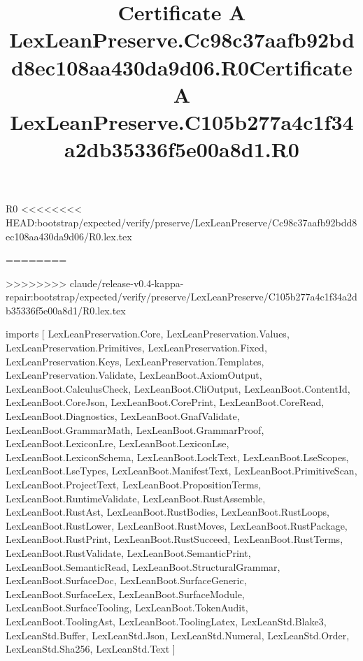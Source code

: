 \begin{lexlean}{R0}
<<<<<<<< HEAD:bootstrap/expected/verify/preserve/LexLeanPreserve/Cc98c37aafb92bdd8ec108aa430da9d06/R0.lex.tex
\title{Certificate A LexLeanPreserve.Cc98c37aafb92bdd8ec108aa430da9d06.R0}
========
\title{Certificate A LexLeanPreserve.C105b277a4c1f34a2db35336f5e00a8d1.R0}
>>>>>>>> claude/release-v0.4-kappa-repair:bootstrap/expected/verify/preserve/LexLeanPreserve/C105b277a4c1f34a2db35336f5e00a8d1/R0.lex.tex
\begin{coremodule}
imports [
  LexLeanPreservation.Core,
  LexLeanPreservation.Values,
  LexLeanPreservation.Primitives,
  LexLeanPreservation.Fixed,
  LexLeanPreservation.Keys,
  LexLeanPreservation.Templates,
  LexLeanPreservation.Validate,
  LexLeanBoot.AxiomOutput,
  LexLeanBoot.CalculusCheck,
  LexLeanBoot.CliOutput,
  LexLeanBoot.ContentId,
  LexLeanBoot.CoreJson,
  LexLeanBoot.CorePrint,
  LexLeanBoot.CoreRead,
  LexLeanBoot.Diagnostics,
  LexLeanBoot.GnafValidate,
  LexLeanBoot.GrammarMath,
  LexLeanBoot.GrammarProof,
  LexLeanBoot.LexiconLre,
  LexLeanBoot.LexiconLse,
  LexLeanBoot.LexiconSchema,
  LexLeanBoot.LockText,
  LexLeanBoot.LseScopes,
  LexLeanBoot.LseTypes,
  LexLeanBoot.ManifestText,
  LexLeanBoot.PrimitiveScan,
  LexLeanBoot.ProjectText,
  LexLeanBoot.PropositionTerms,
  LexLeanBoot.RuntimeValidate,
  LexLeanBoot.RustAssemble,
  LexLeanBoot.RustAst,
  LexLeanBoot.RustBodies,
  LexLeanBoot.RustLoops,
  LexLeanBoot.RustLower,
  LexLeanBoot.RustMoves,
  LexLeanBoot.RustPackage,
  LexLeanBoot.RustPrint,
  LexLeanBoot.RustSucceed,
  LexLeanBoot.RustTerms,
  LexLeanBoot.RustValidate,
  LexLeanBoot.SemanticPrint,
  LexLeanBoot.SemanticRead,
  LexLeanBoot.StructuralGrammar,
  LexLeanBoot.SurfaceDoc,
  LexLeanBoot.SurfaceGeneric,
  LexLeanBoot.SurfaceLex,
  LexLeanBoot.SurfaceModule,
  LexLeanBoot.SurfaceTooling,
  LexLeanBoot.TokenAudit,
  LexLeanBoot.ToolingAst,
  LexLeanBoot.ToolingLatex,
  LexLeanStd.Blake3,
  LexLeanStd.Buffer,
  LexLeanStd.Json,
  LexLeanStd.Numeral,
  LexLeanStd.Order,
  LexLeanStd.Sha256,
  LexLeanStd.Text
]


\end{coremodule}
\end{lexlean}
